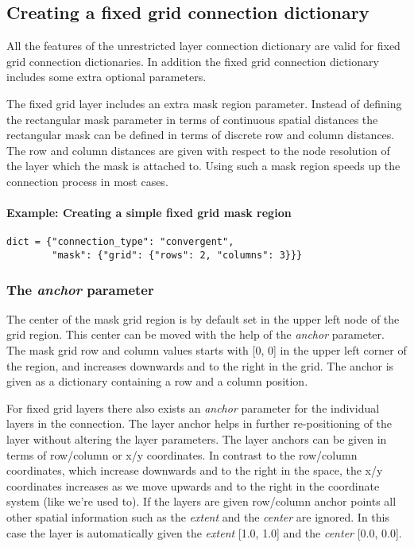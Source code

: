 \documentclass{article}
\begin{document}
\subsection{Creating a fixed grid connection dictionary}

All the features of the unrestricted layer connection dictionary are valid for fixed grid connection dictionaries. In addition the fixed grid connection dictionary includes some extra optional parameters. 

The fixed grid layer includes an extra mask region parameter. Instead of defining the rectangular mask parameter in terms of continuous spatial distances the rectangular mask can be defined in terms of discrete row and column distances. The row and column distances are given with respect to the node resolution of the layer which the mask is attached to. Using such a mask region speeds up the connection process in most cases.

\paragraph{Example: Creating a simple fixed grid mask region}

\begin{verbatim}
dict = {"connection_type": "convergent",
        "mask": {"grid": {"rows": 2, "columns": 3}}}
\end{verbatim}

\subsubsection{The \emph{anchor} parameter}

The center of the mask grid region is by default set in the upper left node of the grid region. This center can be moved with the help of the \emph{anchor} parameter. The mask grid row and column values starts with [0, 0] in the upper left corner of the region, and increases downwards and to the right in the grid. The anchor is given as a dictionary containing a row and a column position.

For fixed grid layers there also exists an \emph{anchor} parameter for the individual layers in the connection. The layer anchor helps in further re-positioning of the layer without altering the layer parameters. The layer anchors can be given in terms of row/column or x/y coordinates. In contrast to the row/column coordinates, which increase downwards and to the right in the space, the x/y coordinates increases as we move upwards and to the right in the coordinate system (like we're used to). If the layers are given row/column anchor points all other spatial information such as the \emph{extent} and the \emph{center} are ignored. In this case the layer is automatically given the \emph{extent} [1.0, 1.0] and the \emph{center} [0.0, 0.0].
\end{document}
